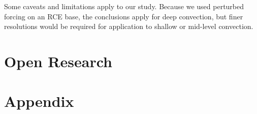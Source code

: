 \documentclass[draft]{agujournal2019}
\begin{document}
Some caveats and limitations apply to our study.  Because we
used perturbed forcing on an RCE base, the conclusions apply for deep
convection, but finer resolutions would be required for application to shallow
or mid-level convection.

\section{Open Research}



%



\newpage
\section*{Appendix}
\setcounter{figure}{0}
\renewcommand{\thefigure}{A\arabic{figure}}
\end{document}
